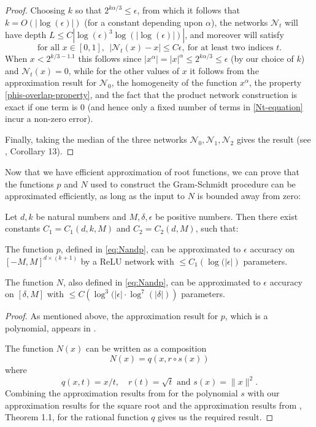 \documentclass[twoside,11pt]{article}
\begin{document}
\begin{proof}
    Choosing $k$ so that  $2^{k\alpha/3} \leq \epsilon$, from which it follows that $k = O(|\log(\epsilon)|)$ (for a constant depending upon $\alpha$), the networks $\mathcal{N}_t$ will have depth $L\leq C|\log(\epsilon)^3\log(|\log(\epsilon)|)|$, and moreover will satisfy 
    \begin{equation}
        \text{for all $x\in [0,1]$},~~|\mathcal{N}_t(x) - x| \leq C\epsilon,~\text{for at least two indices $t$.}
    \end{equation}
    When $x < 2^{k/3-1.1}$ this follows since $|x^\alpha| = |x|^\alpha \leq 2^{k\alpha/3} \leq \epsilon$ (by our choice of $k$) and $\mathcal{N}_t(x) = 0$, while for the other values of $x$ it follows from the approximation result for $\mathcal{N}_0$, the homogeneity of the function $x^\alpha$, the property \eqref{phis-overlap-property}, and the fact that the product network construction is exact if one term is $0$ (and hence only a fixed number of terms in \eqref{Nt-equation} incur a non-zero error). 
    
    Finally, taking the median of the three networks $\mathcal{N}_0,\mathcal{N}_1,\mathcal{N}_2$ gives the result (see \cite{siegel2023optimal}, Corollary 13).
	
\end{proof}
	
Now that we have efficient approximation of root functions, we can prove that the functions $p$ and $N$ used to construct the Gram-Schmidt procedure can be approximated efficiently, as long as the input to $N$ is bounded away from zero:
\begin{lem}\label{lem:Np}
Let $d,k$ be natural numbers and $M,\delta,\epsilon$ be positive numbers. Then there exist constants $C_1=C_1(d,k,M)$ and $C_2=C_2(d,M) $, such that:

The function  $p$, defined in \eqref{eq:Nandp}, can be approximated to $\epsilon$ accuracy on $[-M,M]^{d\times (k+1)} $ by a ReLU network with $\leq  C_1\left(\log(|\epsilon|\right)$ parameters. 

The function $N$, also defined in \eqref{eq:Nandp}, can be approximated to $\epsilon$ accuracy on $[\delta,M] $ with $\leq C\left(\log^3(|\epsilon|\cdot \log^7(|\delta|)\right)$ parameters.
\end{lem}
\begin{proof}
As mentioned above, the approximation result for $p$, which is a polynomial, appears in \cite{yarotsky2017error}.

The function $N(x)$ can be written as a composition 
$$N(x)=q(x,r\circ s(x)) $$
where 
$$q(x,t)=x/t, \quad r(t)=\sqrt t \text{ and } s(x)=\|x\|^2. $$
Combining the approximation results from \cite{yarotsky2017error} for the polynomial $s$ with our approximation results for the square root and the approximation results from \cite{telgarsky_rational}, Theorem 1.1, 
for the rational function $q$ gives us the required result. 
\end{proof}
\end{document}
